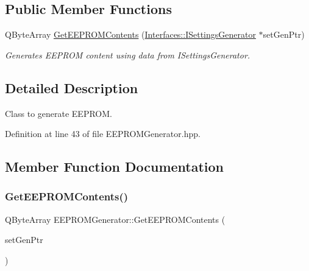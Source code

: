 \subsection*{Public Member Functions}
\begin{DoxyCompactItemize}
\item 
Q\+Byte\+Array \hyperlink{class_e_e_p_r_o_m_generator_a29a14421340137b191f3425d6bcc5cae}{Get\+E\+E\+P\+R\+O\+M\+Contents} (\hyperlink{class_interfaces_1_1_i_settings_generator}{Interfaces\+::\+I\+Settings\+Generator} $\ast$set\+Gen\+Ptr)
\begin{DoxyCompactList}\small\item\em Generates E\+E\+P\+R\+OM content using data from I\+Settings\+Generator. \end{DoxyCompactList}\end{DoxyCompactItemize}


\subsection{Detailed Description}
Class to generate E\+E\+P\+R\+OM. 

Definition at line 43 of file E\+E\+P\+R\+O\+M\+Generator.\+hpp.



\subsection{Member Function Documentation}
\mbox{\label{class_e_e_p_r_o_m_generator_a29a14421340137b191f3425d6bcc5cae}} 
\subsubsection{\texorpdfstring{Get\+E\+E\+P\+R\+O\+M\+Contents()}{GetEEPROMContents()}}
{\footnotesize\ttfamily Q\+Byte\+Array E\+E\+P\+R\+O\+M\+Generator\+::\+Get\+E\+E\+P\+R\+O\+M\+Contents (\begin{DoxyParamCaption}\item[{\hyperlink{class_interfaces_1_1_i_settings_generator}{Interfaces\+::\+I\+Settings\+Generator} $\ast$}]{set\+Gen\+Ptr }\end{DoxyParamCaption})\hspace{0.3cm}{\ttfamily [virtual]}}



